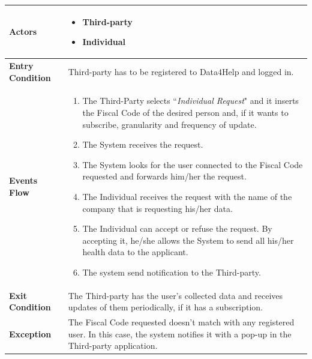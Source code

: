             \begin{table}[H]
            	\centering
                
                \begin{tabular}{|p{3cm}|p{8.2cm}|}
                    \hline
                    \textbf{Actors} &  \begin{itemize}
                                            \item Third-party
                                            \item Individual
                                        \end{itemize}\\
                     \hline
                    \textbf{Entry Condition} & Third-party has to be registered to Data4Help and logged in.\\
                     \hline
                    \textbf{Events Flow} & \begin{enumerate}
                                                \item The Third-Party selects ``\emph{Individual Request}" and it inserts the Fiscal Code of the desired person and, if it wants to subscribe, granularity and frequency of update.
                                                \item The System receives the request.
                                                \item The System looks for the user connected to the Fiscal Code requested and forwards him/her the request.
                                                \item The Individual receives the request with the name of the company that is requesting his/her data.
                                                 \item The Individual can accept or refuse the request. By accepting it, he/she allows the System to send all his/her health data to the applicant.
                                                 \item The system send notification to the Third-party.
                                            \end{enumerate}\\
                     \hline
                    \textbf{Exit Condition} & The Third-party has the user's collected data and receives updates of them periodically, if it has a subscription. \\
                     \hline
                    \textbf{Exception} & The Fiscal Code requested doesn't match with any registered user. In this case, the system notifies it with a pop-up in the Third-party application.\\
                     \hline
                \end{tabular}  
            \end{table} 
            
